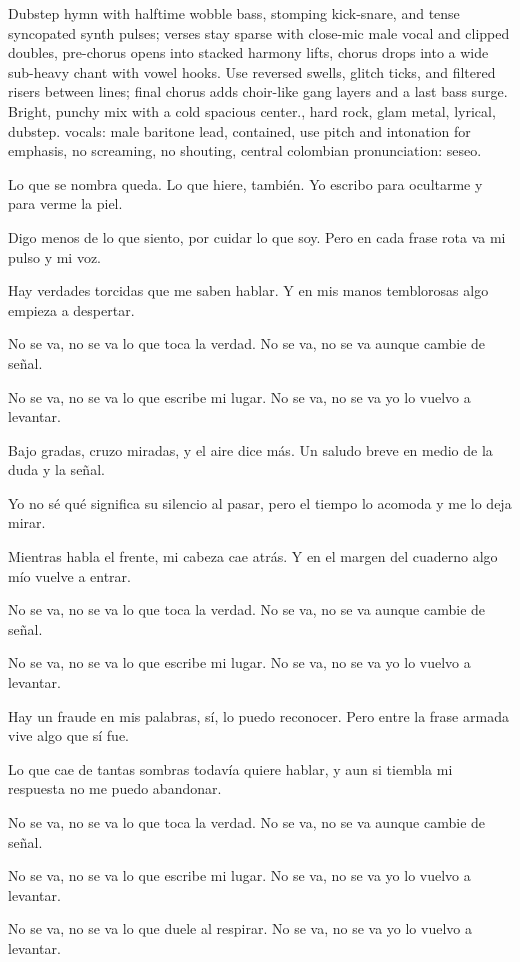 
\begin{notes}

\end{notes}
\begin{style}
Dubstep hymn with halftime wobble bass, stomping kick-snare, and tense syncopated synth pulses; verses stay sparse with close-mic male vocal and clipped doubles, pre-chorus opens into stacked harmony lifts, chorus drops into a wide sub-heavy chant with vowel hooks. %
Use reversed swells, glitch ticks, and filtered risers between lines; final chorus adds choir-like gang layers and a last bass surge. %
Bright, punchy mix with a cold spacious center., hard rock, glam metal, lyrical, dubstep.
vocals: male baritone lead, contained, use pitch and intonation for emphasis, no screaming, no shouting, central colombian pronunciation: seseo.
\end{style}
\begin{lyrics}
Lo que se nombra queda.
Lo que hiere, también.
Yo escribo para ocultarme
y para verme la piel.

Digo menos de lo que siento,
por cuidar lo que soy.
Pero en cada frase rota
va mi pulso y mi voz.

Hay verdades torcidas
que me saben hablar.
Y en mis manos temblorosas
algo empieza a despertar.

No se va, no se va
lo que toca la verdad.
No se va, no se va
aunque cambie de señal.

No se va, no se va
lo que escribe mi lugar.
No se va, no se va
yo lo vuelvo a levantar.

Bajo gradas, cruzo miradas,
y el aire dice más.
Un saludo breve en medio
de la duda y la señal.

Yo no sé qué significa
su silencio al pasar,
pero el tiempo lo acomoda
y me lo deja mirar.

Mientras habla el frente,
mi cabeza cae atrás.
Y en el margen del cuaderno
algo mío vuelve a entrar.

No se va, no se va
lo que toca la verdad.
No se va, no se va
aunque cambie de señal.

No se va, no se va
lo que escribe mi lugar.
No se va, no se va
yo lo vuelvo a levantar.

Hay un fraude en mis palabras,
sí, lo puedo reconocer.
Pero entre la frase armada
vive algo que sí fue.

Lo que cae de tantas sombras
todavía quiere hablar,
y aun si tiembla mi respuesta
no me puedo abandonar.

No se va, no se va
lo que toca la verdad.
No se va, no se va
aunque cambie de señal.

No se va, no se va
lo que escribe mi lugar.
No se va, no se va
yo lo vuelvo a levantar.

No se va, no se va
lo que duele al respirar.
No se va, no se va
yo lo vuelvo a levantar.
\end{lyrics}

